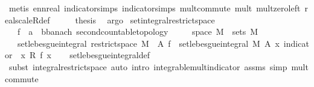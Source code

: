 \begin{isabellebody}
\ {\isacharparenleft}{\kern0pt}metis\ ennreal{\isacharunderscore}{\kern0pt}{}\ indicator{\isacharunderscore}{\kern0pt}simps{\isacharparenleft}{\kern0pt}{}{\isacharparenright}{\kern0pt}\ indicator{\isacharunderscore}{\kern0pt}simps{\isacharparenleft}{\kern0pt}{}{\isacharparenright}{\kern0pt}\ mult{\isachardot}{\kern0pt}commute\ mult{\isacharunderscore}{\kern0pt}{}\ mult{\isacharunderscore}{\kern0pt}zero{\isacharunderscore}{\kern0pt}left\ real{\isacharunderscore}{\kern0pt}scaleR{\isacharunderscore}{\kern0pt}def{\isacharparenright}{\kern0pt}\isanewline
\ \ \isamarkupfalse%
\ \isamarkupfalse%
\ {\isacharquery}{\kern0pt}thesis\ \isamarkupfalse%
\ argo\isanewline
{}\isamarkupfalse%
%
\endisatagproof
{\isafoldproof}%
%
\isadelimproof
\isanewline
%
\endisadelimproof
\isanewline
{}\isamarkupfalse%
\ set{\isacharunderscore}{\kern0pt}integral{\isacharunderscore}{\kern0pt}restrict{\isacharunderscore}{\kern0pt}space{\isacharcolon}{\kern0pt}\isanewline
\ \ \ f\ {\isacharcolon}{\kern0pt}{\isacharcolon}{\kern0pt}\ {\isachardoublequoteopen}{\isacharprime}{\kern0pt}a\ {\isasymRightarrow}\ {\isacharprime}{\kern0pt}b{\isacharcolon}{\kern0pt}{\isacharcolon}{\kern0pt}{\isacharbraceleft}{\kern0pt}banach{\isacharcomma}{\kern0pt}\ second{\isacharunderscore}{\kern0pt}countable{\isacharunderscore}{\kern0pt}topology{\isacharbraceright}{\kern0pt}{\isachardoublequoteclose}\isanewline
\ \ \ {\isachardoublequoteopen}{\isasymOmega}\ {\isasyminter}\ space\ M\ {\isasymin}\ sets\ M{\isachardoublequoteclose}\isanewline
\ \ \ {\isachardoublequoteopen}set{\isacharunderscore}{\kern0pt}lebesgue{\isacharunderscore}{\kern0pt}integral\ {\isacharparenleft}{\kern0pt}restrict{\isacharunderscore}{\kern0pt}space\ M\ {\isasymOmega}{\isacharparenright}{\kern0pt}\ A\ f\ {\isacharequal}{\kern0pt}\ set{\isacharunderscore}{\kern0pt}lebesgue{\isacharunderscore}{\kern0pt}integral\ M\ A\ {\isacharparenleft}{\kern0pt}{\isasymlambda}x{\isachardot}{\kern0pt}\ indicator\ {\isasymOmega}\ x\ {\isacharasterisk}{\kern0pt}\isactrlsub R\ f\ x{\isacharparenright}{\kern0pt}{\isachardoublequoteclose}\isanewline
%
\isadelimproof
\ \ %
\endisadelimproof
%
\isatagproof
{}\isamarkupfalse%
\ set{\isacharunderscore}{\kern0pt}lebesgue{\isacharunderscore}{\kern0pt}integral{\isacharunderscore}{\kern0pt}def\ \isanewline
\ \ \isamarkupfalse%
\ {\isacharparenleft}{\kern0pt}subst\ integral{\isacharunderscore}{\kern0pt}restrict{\isacharunderscore}{\kern0pt}space{\isacharcomma}{\kern0pt}\ auto\ intro{\isacharbang}{\kern0pt}{\isacharcolon}{\kern0pt}\ integrable{\isacharunderscore}{\kern0pt}mult{\isacharunderscore}{\kern0pt}indicator\ assms\ simp{\isacharcolon}{\kern0pt}\ mult{\isachardot}{\kern0pt}commute{\isacharparenright}{\kern0pt}%

\end{isabellebody}
